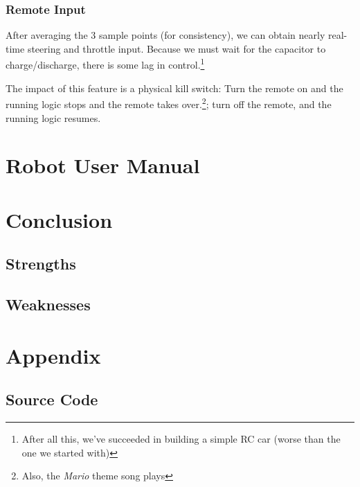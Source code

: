 \documentclass[12pt]{article}
\begin{document}
\subsubsection*{Remote Input}
After averaging the 3 sample points (for consistency), we can obtain nearly real-time steering and throttle input.  Because we must wait for the capacitor to charge/discharge, there is some lag in control.\footnote{After all this, we've succeeded in building a simple RC car (worse than the one we started with)}

The impact of this feature is a physical kill switch: Turn the remote on and the running logic stops and the remote takes over.\footnote{Also, the \textit{Mario} theme song plays}; turn off the remote, and the running logic resumes.

\section{Robot User Manual}

\section{Conclusion}
\subsection{Strengths}
\subsection{Weaknesses}

\section{Appendix}
\subsection{Source Code}
\end{document}
